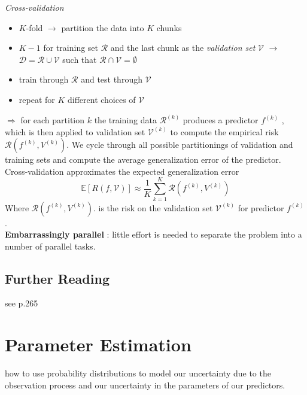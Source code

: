 \textit{Cross-validation} 
\begin{itemize}
	\item $K$-fold $\rightarrow$ partition the data into $K$ chunks
	\item $K -1$ for training set $\mathcal{R}$ and the last chunk as the \textit{validation set } $\mathcal{V}$ $\rightarrow$ $\mathcal{D} = \mathcal{R} \cup \mathcal{V} $ such that $\mathcal{R} \cap \mathcal{V} = \emptyset$
	\item train through $\mathcal{R}$ and test through $\mathcal{V}$
	\item repeat for $K$ different choices of $\mathcal{V}$ 
\end{itemize}
$\Rightarrow$ for each partition $k$ the training data $\mathcal{R}^{(k)}$ produces a predictor $f^{(k)}$ , which is then applied to validation set $\mathcal{V}^{(k)}$ to compute the empirical risk $\mathcal{R}(f^{(k)} , V^{(k)})$. We cycle through all possible partitionings of validation and training sets and compute the average generalization error of the predictor. \\
Cross-validation approximates the expected generalization error
\[
\mathbb{E} [R(f, \mathcal{V})] \approx \frac{1}{K} \sum_{k=1}^{K} \mathcal{R}(f^{(k)} , V^{(k)})
\]
Where $\mathcal{R}(f^{(k)} , V^{(k)})$. is the risk on the validation set $\mathcal{V}^{(k)}$ for predictor $f^{(k)}$. \\
\textbf{Embarrassingly parallel} : little effort is needed to separate the problem into a number of parallel tasks.

\subsection{Further Reading}
see p.265

\section{Parameter Estimation}
how to use probability distributions to model our uncertainty due to the observation process and our uncertainty in the parameters of our predictors.

